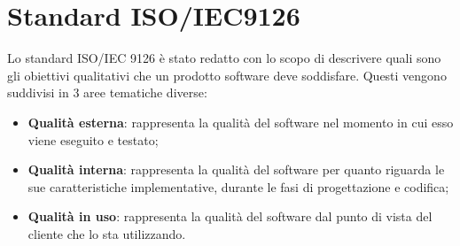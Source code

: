 \section{Standard ISO/IEC9126}
Lo standard ISO/IEC 9126 è stato redatto con lo scopo di descrivere quali sono gli obiettivi qualitativi che un prodotto software deve soddisfare. Questi vengono suddivisi in 3 aree tematiche diverse:
\begin{itemize}
	\item\textbf{Qualità esterna}: rappresenta la qualità del software nel momento in cui esso viene eseguito e testato;
	\item\textbf{Qualità interna}: rappresenta la qualità del software per quanto riguarda le sue caratteristiche implementative, durante le fasi di progettazione e codifica;
	\item\textbf{Qualità in uso}: rappresenta la qualità del software dal punto di vista del cliente che lo sta utilizzando.
\end{itemize}

